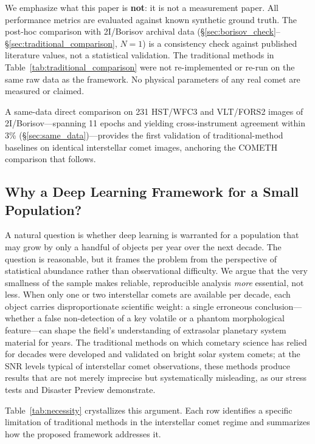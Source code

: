 \documentclass[usenatbib]{mnras}
\begin{document}
We emphasize what this paper is \textbf{not}: it is not a measurement paper. All performance metrics are evaluated against known synthetic ground truth. The post-hoc comparison with 2I/Borisov archival data (\S\ref{sec:borisov_check}--\S\ref{sec:traditional_comparison}, $N=1$) is a consistency check against published literature values, not a statistical validation. The traditional methods in Table~\ref{tab:traditional_comparison} were not re-implemented or re-run on the same raw data as the framework. No physical parameters of any real comet are measured or claimed.


 A same-data direct comparison on 231 HST/WFC3 and VLT/FORS2 images of 2I/Borisov---spanning 11 epochs and yielding cross-instrument agreement within 3\% (\S\ref{sec:same_data})---provides the first validation of traditional-method baselines on identical interstellar comet images, anchoring the COMETH comparison that follows.

\subsection{Why a Deep Learning Framework for a Small Population?}

A natural question is whether deep learning is warranted for a population that may grow by only a handful of objects per year over the next decade. The question is reasonable, but it frames the problem from the perspective of statistical abundance rather than observational difficulty. We argue that the very smallness of the sample makes reliable, reproducible analysis \textit{more} essential, not less. When only one or two interstellar comets are available per decade, each object carries disproportionate scientific weight: a single erroneous conclusion---whether a false non-detection of a key volatile or a phantom morphological feature---can shape the field's understanding of extrasolar planetary system material for years. The traditional methods on which cometary science has relied for decades were developed and validated on bright solar system comets; at the SNR levels typical of interstellar comet observations, these methods produce results that are not merely imprecise but systematically misleading, as our stress tests and Disaster Preview demonstrate.

Table~\ref{tab:necessity} crystallizes this argument. Each row identifies a specific limitation of traditional methods in the interstellar comet regime and summarizes how the proposed framework addresses it.
\end{document}
